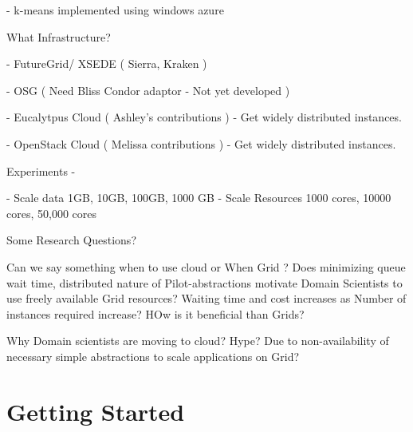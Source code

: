 \documentclass[times]{cpeauth}
\begin{document}
  - k-means implemented using windows azure

What Infrastructure?

  - FutureGrid/ XSEDE ( Sierra, Kraken )

  - OSG ( Need Bliss Condor adaptor - Not yet developed )

  - Eucalytpus Cloud ( Ashley's contributions )
    - Get widely distributed instances. 

  - OpenStack Cloud ( Melissa contributions )
    - Get widely distributed instances. 



Experiments -

  - Scale data 1GB, 10GB, 100GB, 1000 GB
  - Scale Resources 1000 cores, 10000 cores, 50,000 cores


Some Research Questions?
 
Can we say something when to use cloud or When Grid ? 
Does minimizing queue wait time, distributed nature of Pilot-abstractions motivate Domain Scientists to use freely available Grid resources? 
Waiting time and cost increases as Number of instances required increase? 
HOw is it beneficial than Grids? 

Why Domain scientists are moving to cloud? Hype? Due to non-availability of necessary simple abstractions to scale applications on Grid?

\pagebreak

\section{Getting Started}
\end{document}
